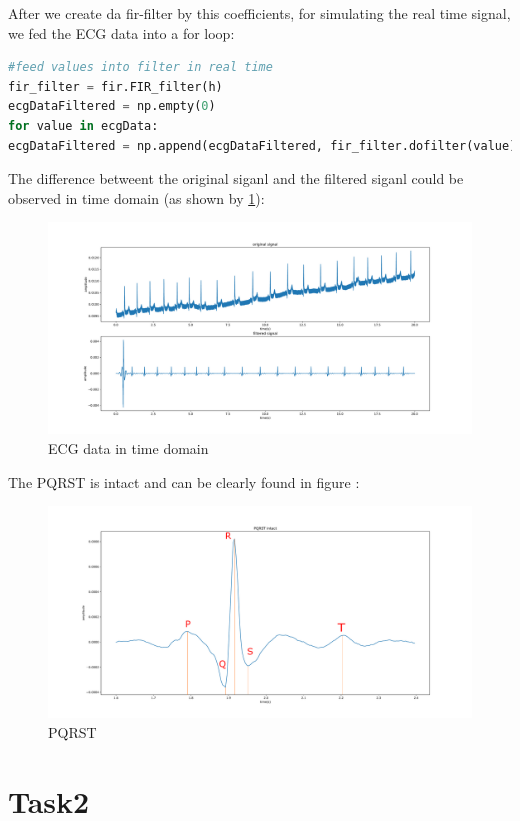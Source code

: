 \documentclass[a4paper,12pt]{article}
\begin{document}
After we create da fir-filter by this coefficients, for simulating the real time signal, we fed the ECG data into a for loop: 
\begin{lstlisting}[language=Python]
#feed values into filter in real time
fir_filter = fir.FIR_filter(h)
ecgDataFiltered = np.empty(0)
for value in ecgData:
ecgDataFiltered = np.append(ecgDataFiltered, fir_filter.dofilter(value))
\end{lstlisting}
The difference betweent the original siganl and the filtered siganl could be observed in time domain (as shown by \ref{fig_ecgTime}): 
\begin{figure}[H]   
	\centering 
	\includegraphics[width=12cm]{../Figures/ecgDataTime.pdf} 
	\caption{ECG data in time domain}   
	\label{fig_ecgTime}
\end{figure}
The PQRST is intact and can be clearly found in figure :
\begin{figure}[H]   
	\centering 
	\includegraphics[width=12cm]{../Figures/PQRST.pdf} 
	\caption{PQRST}   
	\label{fig_PQRST}
\end{figure}

\section{Task2}
\end{document}
